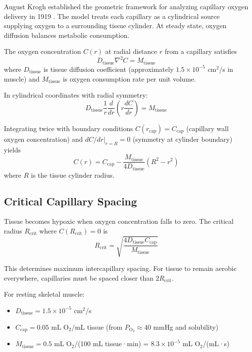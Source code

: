 \documentclass[12pt,a4paper]{article}
\theoremstyle{remark}
\begin{document}
August Krogh established the geometric framework for analyzing capillary oxygen delivery in 1919 \cite{krogh1919number}. The model treats each capillary as a cylindrical source supplying oxygen to a surrounding tissue cylinder. At steady state, oxygen diffusion balances metabolic consumption.

The oxygen concentration $C(r)$ at radial distance $r$ from a capillary satisfies
\begin{equation}
D_{\mathrm{tissue}} \nabla^{2} C = M_{\mathrm{tissue}}
\end{equation}
where $D_{\mathrm{tissue}}$ is tissue diffusion coefficient (approximately $1.5 \times 10^{-5}$ cm$^{2}$/s in muscle) and $M_{\mathrm{tissue}}$ is oxygen consumption rate per unit volume.

In cylindrical coordinates with radial symmetry:
\begin{equation}
D_{\mathrm{tissue}} \frac{1}{r} \frac{d}{dr}\left(r \frac{dC}{dr}\right) = M_{\mathrm{tissue}}
\end{equation}

Integrating twice with boundary conditions $C(r_{\mathrm{cap}}) = C_{\mathrm{cap}}$ (capillary wall oxygen concentration) and $dC/dr|_{r=R} = 0$ (symmetry at cylinder boundary) yields
\begin{equation}
C(r) = C_{\mathrm{cap}} - \frac{M_{\mathrm{tissue}}}{4D_{\mathrm{tissue}}}(R^{2} - r^{2})
\label{eq:krogh}
\end{equation}
where $R$ is the tissue cylinder radius.

\subsection{Critical Capillary Spacing}

Tissue becomes hypoxic when oxygen concentration falls to zero. The critical radius $R_{\mathrm{crit}}$ where $C(R_{\mathrm{crit}}) = 0$ is
\begin{equation}
R_{\mathrm{crit}} = \sqrt{\frac{4D_{\mathrm{tissue}} C_{\mathrm{cap}}}{M_{\mathrm{tissue}}}}
\end{equation}

This determines maximum intercapillary spacing. For tissue to remain aerobic everywhere, capillaries must be spaced closer than $2R_{\mathrm{crit}}$.

For resting skeletal muscle:
\begin{itemize}
\item $D_{\mathrm{tissue}} = 1.5 \times 10^{-5}$ cm$^{2}$/s
\item $C_{\mathrm{cap}} = 0.05$ mL O$_{2}$/mL tissue (from $P_{\mathrm{O}_{2}} \approx 40$ mmHg and solubility)
\item $M_{\mathrm{tissue}} = 0.5$ mL O$_{2}$/(100 mL tissue·min) = $8.3 \times 10^{-5}$ mL O$_{2}$/(mL·s)
\end{itemize}
\end{document}
